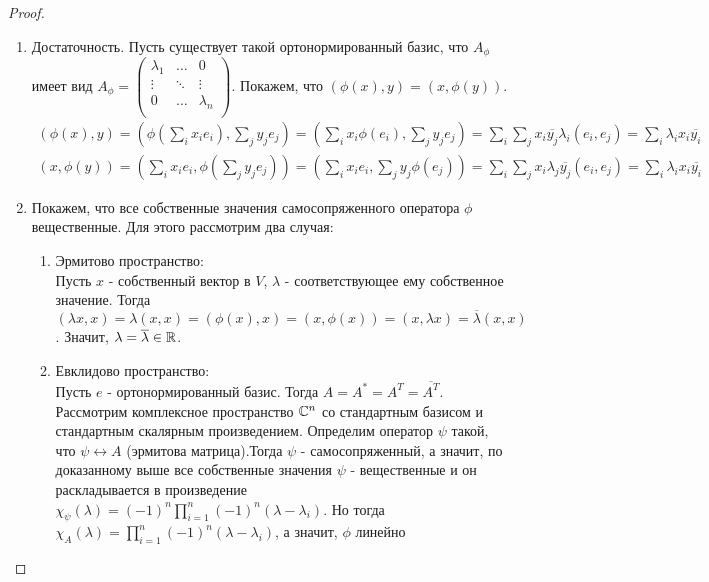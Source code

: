 \begin{proof}
    \begin{enumerate}
        \item Достаточность. Пусть существует такой ортонормированный базис, что $A_{\phi}$ имеет вид $A_{\phi} = 
    \begin{pmatrix}
        \lambda_1  & \dots & 0 \\
		\vdots & \ddots & \vdots \\
        0 & \dots & \lambda_n \\
    \end{pmatrix}$.
        Покажем, что $(\phi(x), y) = (x, \phi(y))$. 
        \begin{gather*}
            (\phi(x), y) = (\phi(\sum_{i} x_i e_i), \sum_{j} y_j e_j) = (\sum_{i} x_i \phi(e_i), \sum_{j} y_j e_j) = 
            \sum_{i} \sum_{j} x_i \overline{y_j} \lambda_i (e_i, e_j) = \sum_{i} \lambda_i x_i \overline{y_i} \\
            (x, \phi(y)) = (\sum_{i} x_i e_i, \phi(\sum_{j} y_j e_j)) = (\sum_{i} x_i e_i, \sum_{j} y_j \phi(e_j)) = 
            \sum_{i} \sum_{j} x_i \lambda_j \overline{y_j} (e_i, e_j) = \sum_{i} \lambda_i x_i \overline{y_i}
        \end{gather*}
        \item Покажем, что все собственные значения самосопряженного оператора $\phi$ вещественные.
        Для этого рассмотрим два случая:
        \begin{enumerate}
            \item Эрмитово пространство: \\
            Пусть $x$ - собственный вектор в $V$, $\lambda$ - соответствующее ему собственное значение.
            Тогда $(\lambda x, x) = \lambda (x, x) = (\phi(x), x) = (x, \phi(x)) = (x, \lambda x) = \overline{\lambda} (x, x)$. Значит, $\lambda = \overline{\lambda} \in \mathbb{R}$.
            \item Евклидово пространство: \\
            Пусть $e$ - ортонормированный базис. Тогда $A = A^* = A^T = \overline{A^T}$. Рассмотрим комплексное пространство $\mathbb{C}^n$
            со стандартным базисом и стандартным скалярным произведением. Определим оператор $\psi$ такой, что $\psi \leftrightarrow A$ (эрмитова матрица).Тогда $\psi$ - самосопряженный, а значит, по доказанному выше все собственные значения $\psi$ - вещественные и он раскладывается в произведение $\chi_{\psi} (\lambda) = (-1)^n \displaystyle\prod_{i = 1}^{n} (-1)^n (\lambda - \lambda_i)$.
            Но тогда $\chi_{A} (\lambda) = \displaystyle\prod_{i = 1}^{n} (-1)^n (\lambda - \lambda_i)$, а значит, $\phi$ линейно 

\end{enumerate}
\end{enumerate}
\end{proof}
